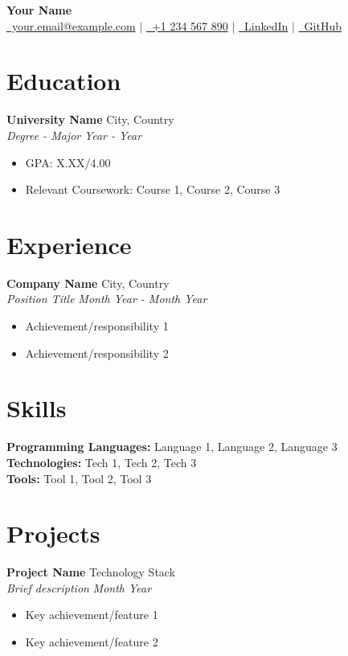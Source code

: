 \documentclass[11pt,a4paper]{article}
\newcommand{\entry}[4]{
    {\bf #1} \hfill {#2}\\
    {\em #3} \hfill {\em #4}\\
}
\begin{document}
\begin{center}
    {\Huge\bf Your Name}\\[5pt]
    \href{mailto:your.email@example.com}{\faEnvelope\ your.email@example.com} $|$
    \href{tel:+1234567890}{\faPhone\ +1 234 567 890} $|$
    \href{https://linkedin.com/in/yourprofile}{\faLinkedin\ LinkedIn} $|$
    \href{https://github.com/yourusername}{\faGithub\ GitHub}
\end{center}

\section{Education}
\entry{University Name}{City, Country}
{Degree - Major}{Year - Year}
\begin{itemize}
    \item GPA: X.XX/4.00
    \item Relevant Coursework: Course 1, Course 2, Course 3
\end{itemize}

\section{Experience}
\entry{Company Name}{City, Country}
{Position Title}{Month Year - Month Year}
\begin{itemize}
    \item Achievement/responsibility 1
    \item Achievement/responsibility 2
\end{itemize}

\section{Skills}
\textbf{Programming Languages:} Language 1, Language 2, Language 3\\
\textbf{Technologies:} Tech 1, Tech 2, Tech 3\\
\textbf{Tools:} Tool 1, Tool 2, Tool 3

\section{Projects}
\entry{Project Name}{Technology Stack}
{Brief description}{Month Year}
\begin{itemize}
    \item Key achievement/feature 1
    \item Key achievement/feature 2
\end{itemize}
\end{document}
